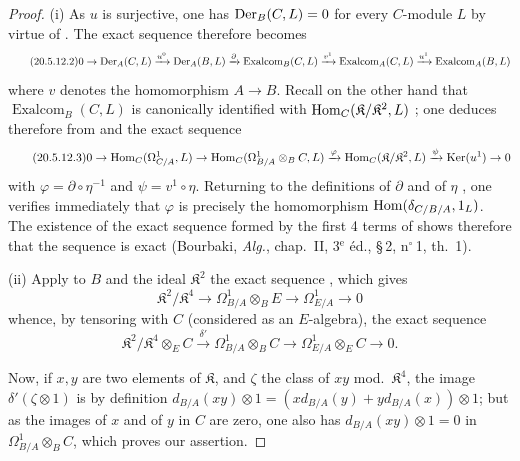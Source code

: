 \begin{proof}
(i) As $u$ is surjective, one has $\operatorname{Der}_B(C,L)=0$ for every $C$-module $L$ by virtue of . The exact sequence  therefore becomes
\begin{equation}
\tag{20.5.12.2}
  \label{0.20.5.12.2}
  0\to\operatorname{Der}_A(C,L)\xrightarrow{u^0}\operatorname{Der}_A(B,L)\xrightarrow{\partial}\operatorname{Exalcom}_B(C,L)
  \xrightarrow{v^1}\operatorname{Exalcom}_A(C,L)\xrightarrow{u^1}\operatorname{Exalcom}_A(B,L)
\end{equation}
where $v$ denotes the homomorphism $A\to B$.
Recall on the other hand that $\operatorname{Exalcom}_B(C,L)$ is canonically identified with $\operatorname{Hom}_C(\mathfrak{K}/\mathfrak{K}^2,L)$ ; one deduces therefore from  and  the exact sequence
\begin{equation}
\tag{20.5.12.3}
  \label{0.20.5.12.3}
  0\to\operatorname{Hom}_C(\Omega^1_{C/A},L)\to\operatorname{Hom}_C(\Omega^1_{B/A}\otimes_B C,L)\xrightarrow{\varphi}\operatorname{Hom}_C(\mathfrak{K}/\mathfrak{K}^2,L)\xrightarrow{\psi}\operatorname{Ker}(u^1)\to 0
\end{equation}
with $\varphi=\partial\circ\eta^{-1}$ and $\psi=v^1\circ\eta$.
Returning to the definitions of $\partial$  and of $\eta$ , one verifies immediately that $\varphi$ is precisely the homomorphism $\operatorname{Hom}(\delta_{C/B/A},1_L)$.
The existence of the exact sequence formed by the first 4 terms of  shows therefore that the sequence  is exact (Bourbaki, \emph{Alg.}, chap.~II, 3$^\text{e}$ \'{e}d., \S\,2, n$^\circ$\,1, th.~1).

\medskip
(ii) Apply to $B$ and the ideal $\mathfrak{K}^2$ the exact sequence , which gives
\begin{equation}
\tag{20.5.12.4}
  \label{0.20.5.12.4}
  \mathfrak{K}^2/\mathfrak{K}^4\to\Omega^1_{B/A}\otimes_B E\to\Omega^1_{E/A}\to 0
\end{equation}
whence, by tensoring with $C$ (considered as an $E$-algebra), the exact sequence
\[
  \mathfrak{K}^2/\mathfrak{K}^4\otimes_E C\xrightarrow{\delta'}\Omega^1_{B/A}\otimes_B C\to\Omega^1_{E/A}\otimes_E C\to 0.
\]

Now, if $x,y$ are two elements of $\mathfrak{K}$, and $\zeta$ the class of $xy$ mod.~$\mathfrak{K}^4$, the image $\delta'(\zeta\otimes 1)$ is by definition $d_{B/A}(xy)\otimes 1=(xd_{B/A}(y)+yd_{B/A}(x))\otimes 1$; but as the images of $x$ and of $y$ in $C$ are zero, one also has $d_{B/A}(xy)\otimes 1=0$ in $\Omega^1_{B/A}\otimes_B C$, which proves our assertion.


\end{proof}
